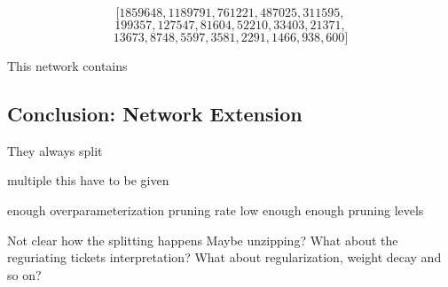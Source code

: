 \[
\big[1859648, 1189791, 761221, 487025, 311595, 
\]
\[
199357, 127547, 81604, 52210, 33403,21371,
\]
\[
13673, 8748, 5597, 3581, 2291, 1466, 938, 600\big]    
\]





This network contains

\subsection{Conclusion: Network Extension}
They always split

multiple this have to be given

enough overparameterization
pruning rate low enough
enough pruning levels

Not clear how the splitting happens
Maybe unzipping?
What about the reguriating tickets interpretation?
What about regularization, weight decay and so on?

